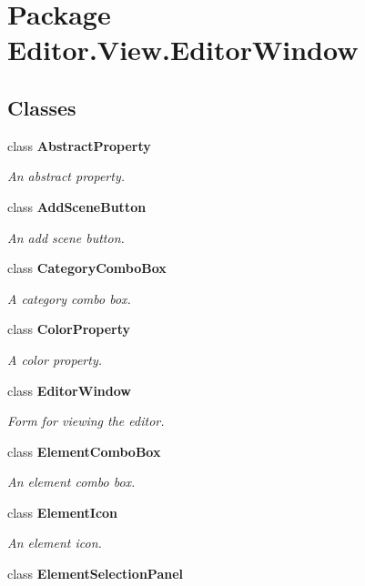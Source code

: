 \section{Package Editor.\-View.\-Editor\-Window}
\label{namespace_editor_1_1_view_1_1_editor_window}
\subsection*{Classes}
\begin{DoxyCompactItemize}
\item 
class {\bf Abstract\-Property}
\begin{DoxyCompactList}\small\item\em An abstract property. \end{DoxyCompactList}\item 
class {\bf Add\-Scene\-Button}
\begin{DoxyCompactList}\small\item\em An add scene button. \end{DoxyCompactList}\item 
class {\bf Category\-Combo\-Box}
\begin{DoxyCompactList}\small\item\em A category combo box. \end{DoxyCompactList}\item 
class {\bf Color\-Property}
\begin{DoxyCompactList}\small\item\em A color property. \end{DoxyCompactList}\item 
class {\bf Editor\-Window}
\begin{DoxyCompactList}\small\item\em Form for viewing the editor. \end{DoxyCompactList}\item 
class {\bf Element\-Combo\-Box}
\begin{DoxyCompactList}\small\item\em An element combo box. \end{DoxyCompactList}\item 
class {\bf Element\-Icon}
\begin{DoxyCompactList}\small\item\em An element icon. \end{DoxyCompactList}\item 
class {\bf Element\-Selection\-Panel}

\end{DoxyCompactItemize}
